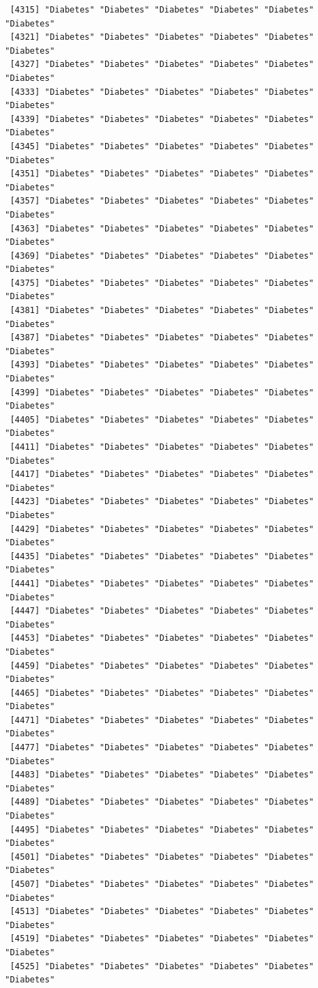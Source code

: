 \documentclass[
  letterpaper,
  DIV=11,
  numbers=noendperiod]{scrartcl}
\begin{document}
\begin{verbatim}
 [4315] "Diabetes" "Diabetes" "Diabetes" "Diabetes" "Diabetes" "Diabetes"
 [4321] "Diabetes" "Diabetes" "Diabetes" "Diabetes" "Diabetes" "Diabetes"
 [4327] "Diabetes" "Diabetes" "Diabetes" "Diabetes" "Diabetes" "Diabetes"
 [4333] "Diabetes" "Diabetes" "Diabetes" "Diabetes" "Diabetes" "Diabetes"
 [4339] "Diabetes" "Diabetes" "Diabetes" "Diabetes" "Diabetes" "Diabetes"
 [4345] "Diabetes" "Diabetes" "Diabetes" "Diabetes" "Diabetes" "Diabetes"
 [4351] "Diabetes" "Diabetes" "Diabetes" "Diabetes" "Diabetes" "Diabetes"
 [4357] "Diabetes" "Diabetes" "Diabetes" "Diabetes" "Diabetes" "Diabetes"
 [4363] "Diabetes" "Diabetes" "Diabetes" "Diabetes" "Diabetes" "Diabetes"
 [4369] "Diabetes" "Diabetes" "Diabetes" "Diabetes" "Diabetes" "Diabetes"
 [4375] "Diabetes" "Diabetes" "Diabetes" "Diabetes" "Diabetes" "Diabetes"
 [4381] "Diabetes" "Diabetes" "Diabetes" "Diabetes" "Diabetes" "Diabetes"
 [4387] "Diabetes" "Diabetes" "Diabetes" "Diabetes" "Diabetes" "Diabetes"
 [4393] "Diabetes" "Diabetes" "Diabetes" "Diabetes" "Diabetes" "Diabetes"
 [4399] "Diabetes" "Diabetes" "Diabetes" "Diabetes" "Diabetes" "Diabetes"
 [4405] "Diabetes" "Diabetes" "Diabetes" "Diabetes" "Diabetes" "Diabetes"
 [4411] "Diabetes" "Diabetes" "Diabetes" "Diabetes" "Diabetes" "Diabetes"
 [4417] "Diabetes" "Diabetes" "Diabetes" "Diabetes" "Diabetes" "Diabetes"
 [4423] "Diabetes" "Diabetes" "Diabetes" "Diabetes" "Diabetes" "Diabetes"
 [4429] "Diabetes" "Diabetes" "Diabetes" "Diabetes" "Diabetes" "Diabetes"
 [4435] "Diabetes" "Diabetes" "Diabetes" "Diabetes" "Diabetes" "Diabetes"
 [4441] "Diabetes" "Diabetes" "Diabetes" "Diabetes" "Diabetes" "Diabetes"
 [4447] "Diabetes" "Diabetes" "Diabetes" "Diabetes" "Diabetes" "Diabetes"
 [4453] "Diabetes" "Diabetes" "Diabetes" "Diabetes" "Diabetes" "Diabetes"
 [4459] "Diabetes" "Diabetes" "Diabetes" "Diabetes" "Diabetes" "Diabetes"
 [4465] "Diabetes" "Diabetes" "Diabetes" "Diabetes" "Diabetes" "Diabetes"
 [4471] "Diabetes" "Diabetes" "Diabetes" "Diabetes" "Diabetes" "Diabetes"
 [4477] "Diabetes" "Diabetes" "Diabetes" "Diabetes" "Diabetes" "Diabetes"
 [4483] "Diabetes" "Diabetes" "Diabetes" "Diabetes" "Diabetes" "Diabetes"
 [4489] "Diabetes" "Diabetes" "Diabetes" "Diabetes" "Diabetes" "Diabetes"
 [4495] "Diabetes" "Diabetes" "Diabetes" "Diabetes" "Diabetes" "Diabetes"
 [4501] "Diabetes" "Diabetes" "Diabetes" "Diabetes" "Diabetes" "Diabetes"
 [4507] "Diabetes" "Diabetes" "Diabetes" "Diabetes" "Diabetes" "Diabetes"
 [4513] "Diabetes" "Diabetes" "Diabetes" "Diabetes" "Diabetes" "Diabetes"
 [4519] "Diabetes" "Diabetes" "Diabetes" "Diabetes" "Diabetes" "Diabetes"
 [4525] "Diabetes" "Diabetes" "Diabetes" "Diabetes" "Diabetes" "Diabetes"

\end{verbatim}
\end{document}
